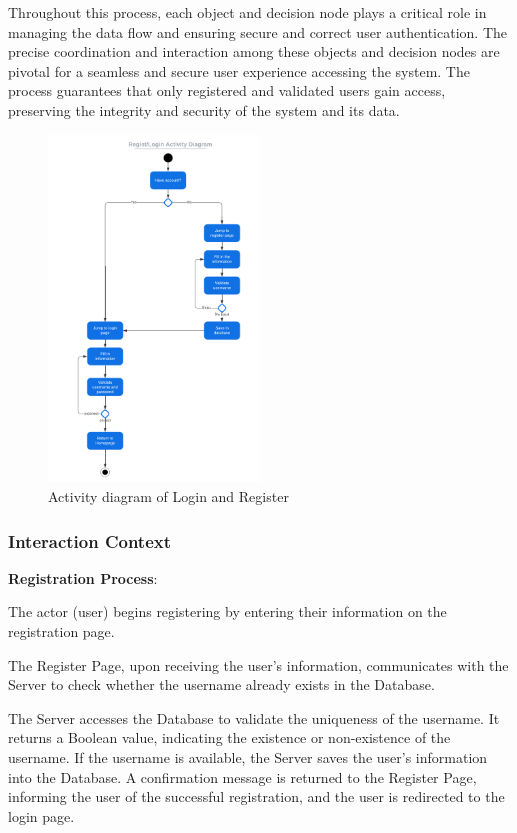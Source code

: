 \documentclass[conference]{IEEEtran}
\begin{document}
Throughout this process, each object and decision node plays a critical role in managing the data flow and ensuring secure and correct user authentication. The precise coordination and interaction among these objects and decision nodes are pivotal for a seamless and secure user experience accessing the system. The process guarantees that only registered and validated users gain access, preserving the integrity and security of the system and its data.

\begin{figure}[htbp]
	\centerline{\includegraphics[width=0.5\textwidth]{Diagram_of_Login_and_Register/Activity_diagram_of_login_regist.pdf}}
	\caption{Activity diagram of Login and Register }
	\label{Activity_diagram_of_login_regist}
\end{figure}
\subsubsection{\textbf{Interaction Context}}
\textbf{}

\textbf{Registration Process}:

The actor (user) begins registering by entering their information on the registration page.

The Register Page, upon receiving the user's information, communicates with the Server to check whether the username already exists in the Database.

The Server accesses the Database to validate the uniqueness of the username. It returns a Boolean value, indicating the existence or non-existence of the username.
If the username is available, the Server saves the user's information into the Database. A confirmation message is returned to the Register Page, informing the user of the successful registration, and the user is redirected to the login page.
\end{document}
